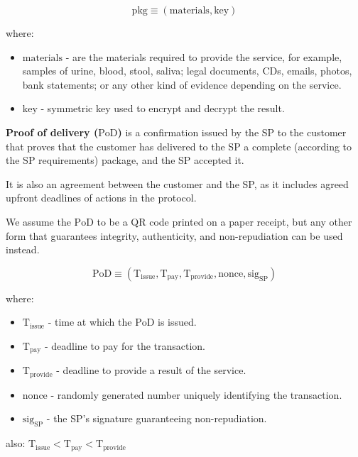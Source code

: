 \documentclass{ieeeaccess}
\begin{document}
$$\mathrm{pkg} \equiv (\mathrm{materials}, \mathrm{key})$$

where:

\begin{itemize}

\item $\mathrm{materials}$ - are the materials required to provide the service, for example, samples of urine, blood, stool, saliva; legal documents, CDs, emails, photos, bank statements; or any other kind of evidence depending on the service.
\item $\mathrm{key}$ - symmetric key used to encrypt and decrypt the result.
\end{itemize}

\noindent \textbf
{Proof of delivery ($\mathrm{PoD}$)}\label{proof-of-delivery} is a  confirmation issued by the SP to the customer that proves that the customer has delivered to the SP a complete (according to the SP requirements) package, and the SP accepted it.

It is also an agreement between the customer and the SP, as it includes agreed upfront deadlines of actions in the protocol.

We assume the $\mathrm{PoD}$ to be a QR code printed on a paper receipt, but any other form that guarantees integrity, authenticity, and non-repudiation can be used instead. 

$$\mathrm{PoD} \equiv (\mathrm{T}_\mathrm{issue}, \mathrm{T}_\mathrm{pay}, \mathrm{T}_\mathrm{provide}, \mathrm{nonce}, \mathrm{sig}_\mathrm{SP})$$

where:

\begin{itemize}

\item $\mathrm{T}_\mathrm{issue}$ - time at which the $\mathrm{PoD}$ is issued.
\item
  $\mathrm{T}_\mathrm{pay}$ - deadline to pay for the transaction.
\item
  $\mathrm{T}_\mathrm{provide}$ - deadline to provide a result of the service.
\item $\mathrm{nonce}$ - randomly generated number uniquely identifying the transaction.
\item $\mathrm{sig}_\mathrm{SP}$ - the SP's signature guaranteeing non-repudiation.
\end{itemize}

also:
\(\mathrm{T}_\mathrm{issue} < \mathrm{T}_\mathrm{pay} < \mathrm{T}_\mathrm{provide}\)
\end{document}
